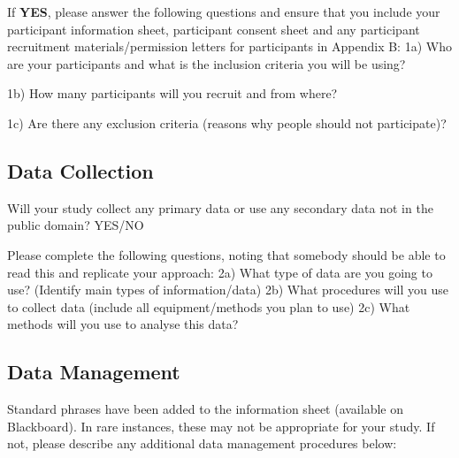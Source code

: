 \documentclass[../CHEFCookingHelperForEveryonesFridge.tex]{subfiles}
\begin{document}

If \textbf{YES}, please answer the following questions and ensure that you include your participant information sheet, participant consent sheet and any participant recruitment materials/permission letters for participants in Appendix B:
1a) Who are your participants and what is the inclusion criteria you will be using?

1b) How many participants will you recruit and from where?

1c) Are there any exclusion criteria (reasons why people should not participate)?

\subsection{Data Collection}
Will your study collect any primary data or use any secondary data not in the public domain?                              						YES/NO

Please complete the following questions, noting that somebody should be able to read this and replicate your approach:
2a) What type of data are you going to use? (Identify main types of information/data)
2b) What procedures will you use to collect data (include all equipment/methods you plan to use)
2c) What methods will you use to analyse this data?

\subsection{Data Management}
Standard phrases have been added to the information sheet (available on Blackboard). In rare instances, these may not be appropriate for your study. If not, please describe any additional data management procedures below:
\end{document}
